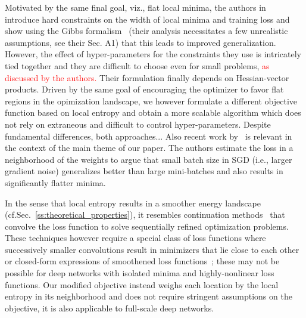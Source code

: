 \documentclass[10pt]{article}
\newcommand{\pc}[2]{{\color{ForestGreen}#1}\marginpar{\tiny\noindent{\raggedright{\color{Sienna}[PC]}\color{Sienna}{#2} \par}}}
\newcommand{\todo}[1]{{\color{gray}#1}\marginpar{\tiny\noindent{\raggedright{\color{blue}[TODO]}}}}
\newcommand{\fix}[2]{{\color{blue}#1}\marginpar{\tiny\noindent{\raggedright{\color{blue}[FIX]}\color{blue}{#2} \par}}}
\begin{document}
Motivated by the same final goal, viz., flat local minima, the authors in~\citet{hochreiter1997flat} introduce hard constraints on the width of local minima and training loss and show using the Gibbs formalism~\citep{haussler1997mutual} \fix{(their analysis necessitates a few unrealistic assumptions, see their Sec. A1)}{we might consider deleting this} that this leads to improved generalization. However, the effect of hyper-parameters for the constraints they use is intricately tied together and they are difficult to choose even for small problems, \textcolor{red}{as discussed by the authors.} Their formulation finally depends on Hessian-vector products. Driven by the same goal of encouraging the optimizer to favor flat regions in the opimization landscape, we however formulate a different objective function based on local entropy and obtain a more scalable algorithm which does not rely on extraneous and difficult to control hyper-parameters. \fix{Despite fundamental differences, both approaches... }{one sentence about the similarities} Also recent work by~\citet{keskar2016large} is relevant in the context of the main theme of our paper. The authors estimate the loss in a neighborhood of the weights to argue that small batch size in SGD (i.e., larger gradient noise) generalizes better than large mini-batches and also results in significantly flatter minima.

\todo{In the sense that local entropy results in a smoother energy landscape (cf.\@ Sec.~\ref{ss:theoretical_properties}), it resembles continuation methods~\citep{allgower2012numerical} that convolve the loss function to solve sequentially refined optimization problems. These techniques however require a special class of loss functions where successively smaller convolutions result in minimizers that lie close to each other or closed-form expressions of smoothened loss functions~\citep{DBLP:conf/icml/HazanLS16,mobahi2015link}; these may not be possible for deep networks with isolated minima and highly-nonlinear loss functions. Our modified objective instead weighs each location by the local entropy in its neighborhood and does not require stringent assumptions on the objective, it is also applicable to full-scale deep networks.} %
\end{document}
